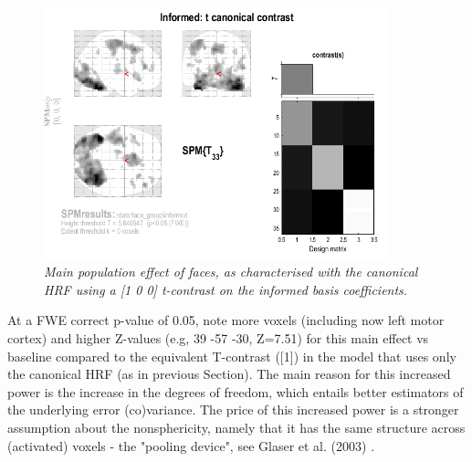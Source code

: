 \begin{figure}
\begin{center}
\includegraphics[width=100mm]{faces_group/informed_t}
\caption{\em Main population effect of faces, as characterised with the canonical HRF using a [1 0 0] t-contrast on the informed basis coefficients. \label{informed_t}}
\end{center}
\end{figure}
At a FWE correct p-value of 0.05, note more voxels (including now left motor cortex) and higher Z-values (e.g, 39 -57 -30, Z=7.51) for this main effect vs baseline compared to the equivalent T-contrast ([1]) in the model that uses only the canonical HRF (as in previous Section). 
The main reason for this increased power is the increase in the degrees of freedom, which entails better estimators of the underlying error (co)variance. The price of this increased power is a stronger assumption about the nonsphericity, namely that it has the same structure across (activated) voxels - the "pooling device", see Glaser et al. (2003) \cite{daniel_hbf2}.

